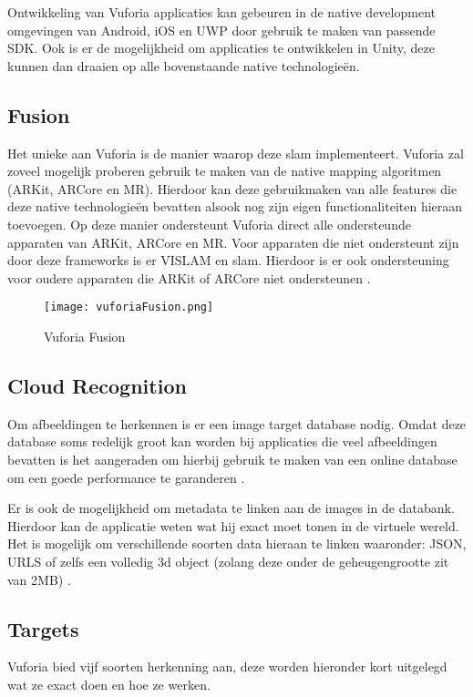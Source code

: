 Ontwikkeling van Vuforia applicaties kan gebeuren in de native development omgevingen van Android, iOS en UWP door gebruik te maken van passende SDK. Ook is er de mogelijkheid om applicaties te ontwikkelen in Unity, deze kunnen dan draaien op alle bovenstaande native technologieën.

\subsection{Fusion}
Het unieke aan Vuforia is de manier waarop deze \acrshort{slam} implementeert. Vuforia zal zoveel mogelijk proberen gebruik te maken van de native mapping algoritmen (ARKit, ARCore en MR). Hierdoor kan deze gebruikmaken van alle features die deze native technologieën bevatten alsook nog zijn eigen functionaliteiten hieraan toevoegen. Op deze manier ondersteunt Vuforia direct alle ondersteunde apparaten van ARKit, ARCore en MR. Voor apparaten die niet ondersteunt zijn door deze frameworks is er VISLAM en \acrshort{slam}. Hierdoor is er ook ondersteuning voor oudere apparaten die ARKit of ARCore niet ondersteunen \autocite{VuforiaFusion}.
\begin{figure}
    \texttt{[image: vuforiaFusion.png]}
    \caption{Vuforia Fusion}
    \label{fig:vuforiaFusion}
\end{figure}

\subsection{Cloud Recognition}
Om afbeeldingen te herkennen is er een image target database nodig. Omdat deze database soms redelijk groot kan worden bij applicaties die veel afbeeldingen bevatten is het aangeraden om hierbij gebruik te maken van een online database om een goede performance te garanderen \autocite{VuforiaCloudReco}. 

Er is ook de mogelijkheid om metadata te linken aan de images in de databank. Hierdoor kan de applicatie weten wat hij exact moet tonen in de virtuele wereld. Het is mogelijk om verschillende soorten data hieraan te linken waaronder: JSON, URLS of zelfs een volledig 3d object (zolang deze onder de geheugengrootte zit van 2MB) \autocite{VuforiaCloudReco}.

\subsection{Targets}
Vuforia bied vijf soorten herkenning aan, deze worden hieronder kort uitgelegd wat ze exact doen en hoe ze werken.

